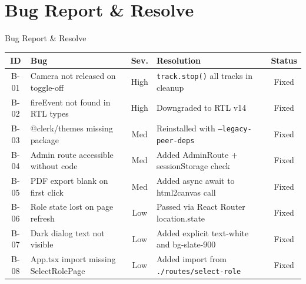 \documentclass{beamer}
\begin{document}
\section{Bug Report \& Resolve}
\begin{frame}{Bug Report \& Resolve}
\tiny
\begin{table}
\centering
\begin{tabular}{|c|p{2cm}|c|p{2.8cm}|c|}
\hline
\textbf{ID} & \textbf{Bug} & \textbf{Sev.} & \textbf{Resolution} & \textbf{Status} \\ \hline
B-01 & Camera not released on toggle-off & High & \texttt{track.stop()} all tracks in cleanup & Fixed \\ \hline
B-02 & fireEvent not found in RTL types & High & Downgraded to RTL v14 & Fixed \\ \hline
B-03 & @clerk/themes missing package & Med & Reinstalled with \texttt{--legacy-peer-deps} & Fixed \\ \hline
B-04 & Admin route accessible without code & Med & Added AdminRoute + sessionStorage check & Fixed \\ \hline
B-05 & PDF export blank on first click & Med & Added async await to html2canvas call & Fixed \\ \hline
B-06 & Role state lost on page refresh & Low & Passed via React Router location.state & Fixed \\ \hline
B-07 & Dark dialog text not visible & Low & Added explicit text-white and bg-slate-900 & Fixed \\ \hline
B-08 & App.tsx import missing SelectRolePage & Low & Added import from \texttt{./routes/select-role} & Fixed \\ \hline
\end{tabular}
\end{table}
\end{frame}

\end{document}

